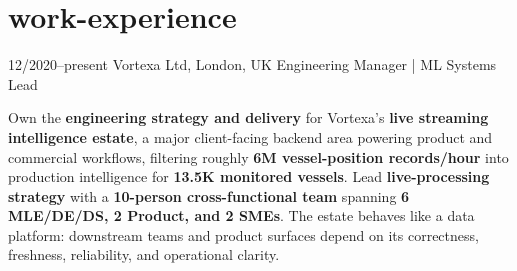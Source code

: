\documentclass[]{../../friggeri-cv}
\begin{document}
\section{work-experience}
\begin{entrylist}
    \entry
    {12/2020--present}
    {Vortexa Ltd, London, UK}
        {Engineering Manager | ML Systems Lead}
    {
        {\small
        \setlength{\parindent}{0pt}
        \setlength{\leftskip}{0pt}
                                    Own the \textbf{engineering strategy and delivery} for Vortexa's \textbf{live streaming intelligence estate}, a major client-facing backend area powering product and commercial workflows, filtering roughly \textbf{6M vessel-position records/hour} into production intelligence for \textbf{13.5K monitored vessels}. Lead \textbf{live-processing strategy} with a \textbf{10-person cross-functional team} spanning \textbf{6 MLE/DE/DS, 2 Product, and 2 SMEs}. The estate behaves like a data platform: downstream teams and product surfaces depend on its correctness, freshness, reliability, and operational clarity.

}}
\end{entrylist}
\end{document}
